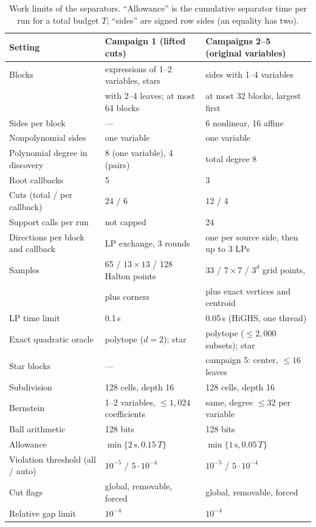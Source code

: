 \begin{table}[ht]
\centering\footnotesize
\caption{Work limits of the separators. ``Allowance'' is the cumulative
separator time per run for a total budget $T$; ``sides'' are signed row sides
(an equality has two).}\label{tab:limits}
\begin{tabular}{@{}lll@{}}
\toprule
Setting & Campaign 1 (lifted cuts) & Campaigns 2--5 (original variables)\\
\midrule
Blocks & expressions of 1--2 variables, stars & sides with 1--4 variables\\
       & with 2--4 leaves; at most 64 blocks & at most 32 blocks, largest first\\
Sides per block & --- & 6 nonlinear, 16 affine\\
Nonpolynomial sides & one variable & one variable\\
Polynomial degree in discovery & 8 (one variable), 4 (pairs) & total degree 8\\
Root callbacks & 5 & 3\\
Cuts (total / per callback) & 24 / 6 & 12 / 4\\
Support calls per run & not capped & 24\\
Directions per block and callback & LP exchange, 3 rounds & one per source side, then up to 3 LPs\\
Samples & 65 / $13\times13$ / 128 Halton points & 33 / $7\times7$ / $3^d$ grid points,\\
        & plus corners & plus exact vertices and centroid\\
LP time limit & 0.1\,s & 0.05\,s (HiGHS, one thread)\\
Exact quadratic oracle & polytope ($d=2$); star & polytope ($\le2{,}000$ subsets); star\\
Star blocks & --- & campaign 5: center, $\le16$ leaves\\
Subdivision & 128 cells, depth 16 & 128 cells, depth 16\\
Bernstein & 1--2 variables, $\le1{,}024$ coefficients & same, degree $\le32$ per variable\\
Ball arithmetic & 128 bits & 128 bits\\
Allowance & $\min\{2\,\mathrm s,0.15\,T\}$ & $\min\{1\,\mathrm s,0.05\,T\}$\\
Violation threshold (all / auto) & $10^{-5}$ / $5\cdot10^{-4}$ & $10^{-5}$ / $5\cdot10^{-4}$\\
Cut flags & global, removable, forced & global, removable, forced\\
Relative gap limit & $10^{-4}$ & $10^{-4}$\\
\bottomrule
\end{tabular}
\end{table}

